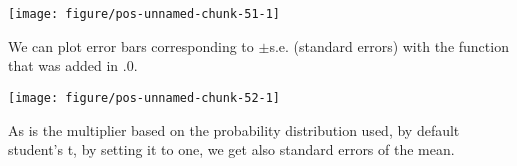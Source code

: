\documentclass[paper=a4,headsepline,BCOR=12mm,twoside,open=right,%
titlepage,headings=small,fontsize=10pt,index=totoc,bibliography=totoc,%
captions=tableheading,captions=nooneline]{scrbook}\usepackage{knitr}
\begin{document}
\begin{knitrout}\footnotesize
{}\color{fgcolor}\begin{kframe}
\begin{alltt}
 \hlopt{+} \hlstd{(} \hlstd{=} \hlstd{,}
                     \hlstd{=} \hlstd{(} \hlstd{=} \hlstd{),}
                     \hlstd{=} \hlstd{,}  \hlstd{=} \hlstd{,}  \hlstd{=} \hlstd{)}
\end{alltt}
\end{kframe}

{\centering \texttt{[image: figure/pos-unnamed-chunk-51-1]} 

}



\end{knitrout}

We can plot error bars corresponding to $\pm$s.e. (standard errors) with the function  that was added in .0.

\begin{knitrout}\footnotesize
{}\color{fgcolor}\begin{kframe}
\begin{alltt}
 \hlopt{+} \hlstd{(} \hlstd{=} \hlstd{,}
                    \hlstd{=}\hlstd{,} \hlstd{=}\hlstd{,} \hlstd{=}\hlstd{)}
\end{alltt}
\end{kframe}

{\centering \texttt{[image: figure/pos-unnamed-chunk-52-1]} 

}



\end{knitrout}

As  is the multiplier based on the probability distribution used, by default student's {t}, by setting it to one, we get also standard errors of the mean.
\end{document}
